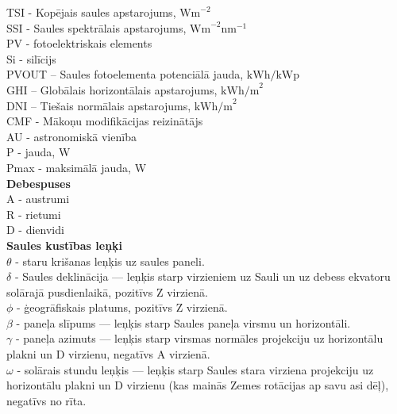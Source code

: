 \noindent TSI - Kopējais saules apstarojums, $\textrm{Wm}^{-2}$\\
SSI - Saules spektrālais apstarojums, $\textrm{Wm}^{-2}\textrm{nm}^{-1}$\\
PV - fotoelektriskais elements\\ %
Si - silīcijs\\
PVOUT – Saules fotoelementa potenciālā jauda, $\textrm{kWh/kWp}$\\ %
GHI – Globālais horizontālais apstarojums,  $\textrm{kWh/m}^2$\\ %
DNI – Tiešais normālais apstarojums, $\textrm{kWh/m}^2$\\ %
CMF - Mākoņu modifikācijas reizinātājs\\
AU - astronomiskā vienība\\  %
P - jauda, 	W\\
Pmax - maksimālā jauda, W\\
\textbf{Debespuses}\\
A - austrumi\\
R - rietumi\\
D - dienvidi\\
\textbf{Saules kustības leņķi}\\
$\theta$ - staru krišanas leņķis uz saules paneli.\\
$\delta$ - Saules deklinācija --- leņķis starp virzieniem uz Sauli un uz debess ekvatoru solārajā pusdienlaikā, pozitīvs Z virzienā.\\
 $\phi$  - ģeogrāfiskais platums, pozitīvs Z virzienā.\\
$\beta$  - paneļa slīpums --- leņķis starp Saules paneļa virsmu un horizontāli.\\
$\gamma$ - paneļa azimuts --- leņķis starp virsmas normāles projekciju uz horizontālu  plakni un D virzienu, negatīvs A virzienā.\\
$\omega$ - solārais stundu leņķis --- leņķis starp Saules stara virziena projekciju uz horizontālu plakni un D virzienu (kas mainās Zemes rotācijas ap  savu asi dēļ), negatīvs no rīta.